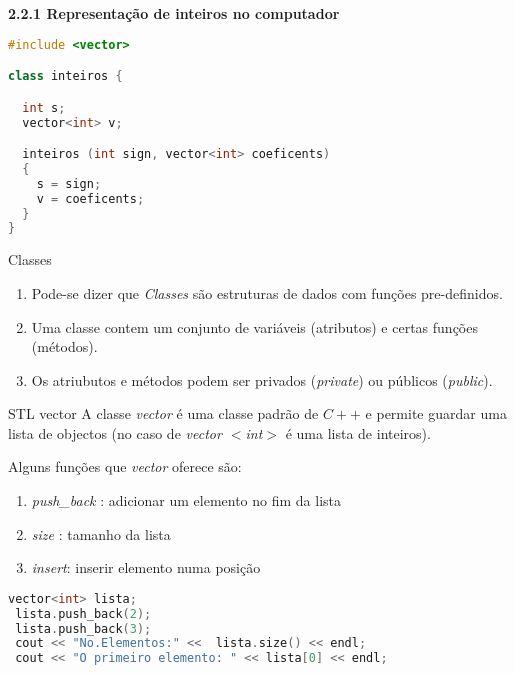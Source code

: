\documentclass{beamer}
\begin{document}
\begin{frame}[fragile]{\bf 2.}{\bf 2.1 Representação de inteiros no computador}

\begin{lstlisting}[language=C++]
#include <vector>

class inteiros {

  int s;
  vector<int> v;

  inteiros (int sign, vector<int> coeficents)
  {
    s = sign;
    v = coeficents;
  }
}

\end{lstlisting}
\end{frame}


\begin{frame}{Classes}

\begin{enumerate} 
 \item \pause Pode-se dizer que {\it Classes} são estruturas de dados com funções pre-definidos.
\item \pause Uma classe contem um conjunto de variáveis (atributos) e certas funções (métodos).
\item \pause Os atriubutos  e métodos podem ser privados ({\it private}) ou públicos ({\it public}).
\end{enumerate}

\end{frame}

\begin{frame}[fragile]{STL vector}
A classe {\it vector} é uma classe padrão de $C++$ e permite guardar uma lista de objectos (no caso de {\it vector $<$int$>$} é uma lista de inteiros).

Alguns funções que {\it vector} oferece são:
\begin{enumerate}
 \item {\it push\_back} : adicionar um elemento no fim da lista
\item {\it size} : tamanho da lista
\item {\it insert}: inserir elemento numa posição
\end{enumerate}

\begin{lstlisting}[language=C++]
 vector<int> lista;
 lista.push_back(2);
 lista.push_back(3);
 cout << "No.Elementos:" <<  lista.size() << endl;
 cout << "O primeiro elemento: " << lista[0] << endl;
\end{lstlisting}

\end{frame}
\end{document}

